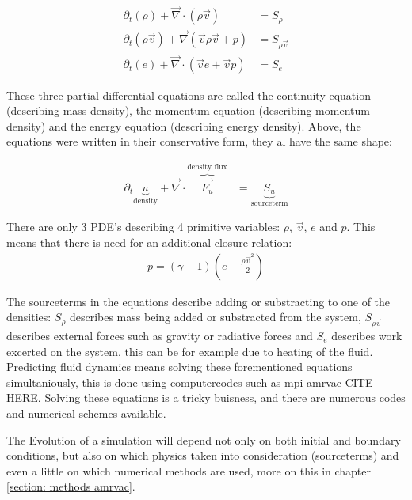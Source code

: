 \begin{align}
 \partial_t \left(\rho \right) + \vec{\nabla} \cdot \left( \rho \vec{v}  \right) &= S_\rho \\
 \partial_t \left(\rho \vec{v} \right) + \vec{\nabla} \left( \vec{v} \rho \vec{v} + p \right)    &= S_{\rho \vec{v}} \\
 \partial_t \left(e \right) + \vec{\nabla} \cdot \left( \vec{v} e + \vec{v} p \right) &= S_e
\end{align}

These three partial differential equations are called the continuity equation (describing mass density), the momentum equation (describing momentum density) and the energy equation (describing energy density). Above, the equations were written in their conservative form, they al have the same shape:

\begin{align}
	\partial_t \underbrace{u}_\text{density} + \vec{\nabla} \cdot \overbrace{\vec{F_u}}^\text{density flux} &= \underbrace{S_u}_\text{sourceterm}
\end{align}

There are only 3 PDE's describing 4 primitive variables: $\rho$, $\vec{v}$, $e$ and $p$. This means that there is need for an additional closure relation:
\begin{align}
	p = (\gamma - 1) \left(e - \frac{\rho \vec{v}^2}{2} \right) \label{gas_closing}
\end{align}

The sourceterms in the equations describe adding or substracting to one of the densities: $S_\rho$ describes mass being added or substracted from the system, $S_{\rho \vec{v}}$ describes external forces such as gravity or radiative forces and $S_e$ describes work excerted on the system, this can be for example due to heating of the fluid.\\

Predicting fluid dynamics means solving these forementioned equations simultaniously, this is done using computercodes such as mpi-amrvac CITE HERE. Solving these equations is a tricky buisness, and there are numerous codes and numerical schemes available.


The Evolution of a simulation will depend not only on both initial and boundary conditions, but also on which physics taken into consideration (sourceterms) and even a little on which numerical methods are used, more on this in chapter \ref{section: methods amrvac}.\\


